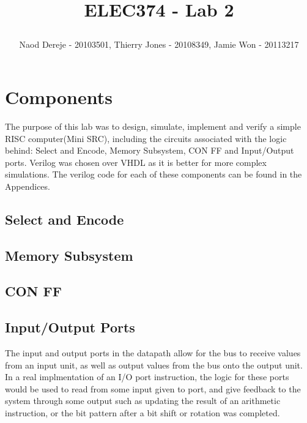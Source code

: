 \documentclass{article}
\title{
    \begin{large}
        ELEC374 - Lab 2
    \end{large}
}
\author{Naod Dereje - 20103501, Thierry Jones - 20108349, Jamie Won - 20113217}
\begin{document}
\maketitle
\cleardoublepage
\tableofcontents
\cleardoublepage


\section{Components}
    The purpose of this lab was to design, simulate, implement and verify a simple RISC computer(Mini SRC), including the circuits associated with the logic behind: 
    Select and Encode, Memory Subsystem, CON FF and Input/Output ports. Verilog was chosen over VHDL as it is better for more complex simulations. The verilog code 
    for each of these components can be found in the Appendices.
    
    \subsection{Select and Encode}


    \subsection{Memory Subsystem}
    

    \subsection{CON FF}
    

    \subsection{Input/Output Ports}
    The input and output ports in the datapath allow for the bus to receive values from an input unit, as well as output values from the bus onto the output unit. In a real implmentation of an I/O port instruction, the logic for these ports would be used to read from some input given to port, and give feedback to the system through some output such as updating the result of an arithmetic instruction, or the bit pattern after a bit shift or rotation was completed.
\end{document}
